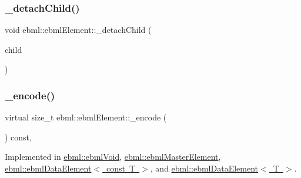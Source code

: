 \mbox{\label{classebml_1_1ebmlElement_ae2e24c1aa8ef7bd93c1ec64573afaff1}} 
\subsubsection{\texorpdfstring{\+\_\+detach\+Child()}{\_detachChild()}}
{\footnotesize\ttfamily void ebml\+::ebml\+Element\+::\+\_\+detach\+Child (\begin{DoxyParamCaption}\item[{const \mbox{\hyperlink{namespaceebml_adad533b7705a16bb360fe56380c5e7be}{ebml\+Element\+\_\+sp}} \&}]{child }\end{DoxyParamCaption})\hspace{0.3cm}{\ttfamily [protected]}}

\mbox{\label{classebml_1_1ebmlElement_a27bd9de14e1706840235b68331917776}} 
\subsubsection{\texorpdfstring{\+\_\+encode()}{\_encode()}}
{\footnotesize\ttfamily virtual size\+\_\+t ebml\+::ebml\+Element\+::\+\_\+encode (\begin{DoxyParamCaption}\item[{char $\ast$}]{ }\end{DoxyParamCaption}) const\hspace{0.3cm}{\ttfamily [protected]}, {}}



Implemented in \mbox{\hyperlink{classebml_1_1ebmlVoid_a58183338cb3b41b188cddfbb09a281d5}{ebml\+::ebml\+Void}}, \mbox{\hyperlink{classebml_1_1ebmlMasterElement_aa0dd7215a5de90f8a52364df781952e2}{ebml\+::ebml\+Master\+Element}}, \mbox{\hyperlink{classebml_1_1ebmlDataElement_3_01const_01T_01_4_aac802a573eaeaa5b856d5e74deb9dd3a}{ebml\+::ebml\+Data\+Element$<$ const T $>$}}, and \mbox{\hyperlink{classebml_1_1ebmlDataElement_aabb10c15457709e0aa2c1f5744ddbfff}{ebml\+::ebml\+Data\+Element$<$ T $>$}}.

\mbox{\label{classebml_1_1ebmlElement_a54744a82d2007dac6d8ee795786cc881}} 
